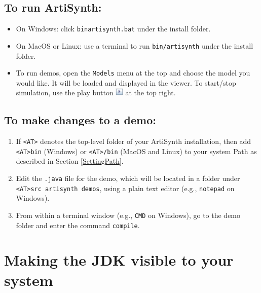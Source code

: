 \documentclass{article}
\begin{document}
\subsection{To run ArtiSynth:}

\begin{itemize}[leftmargin=26pt]
 
\item On Windows: click {\tt bin\BKS artisynth.bat} under the install folder. 
 
\item On MacOS or Linux: use a terminal to run {\tt bin/artisynth} 
under the install folder.

\item[\ ] To run demos, open the {\tt Models} menu at the top and
choose the model you would like. It will be loaded and displayed in
the viewer. To start/stop simulation, use the play button
\includegraphics[width=0.15in]{images/playButton} at the top right.

\end{itemize}

\subsection{To make changes to a demo:}

\begin{enumerate}

\item If {\tt <AT>} denotes the top-level folder of your ArtiSynth
installation, then add {\tt <AT>\BKS bin} (Windows) or {\tt <AT>/bin}
(MacOS and Linux) to your system Path
as described in Section \ref{SettingPath}.

\item Edit the {\tt .java} file for the demo, which will be located
in a folder under {\tt <AT>\BKS src \BKS artisynth \BKS demos},
using a plain text editor (e.g., {\tt notepad} on Windows).

\item From within a terminal window (e.g., {\tt CMD} on Windows), go to the
demo folder and enter the command {\tt compile}.

\end{enumerate}

\section{Making the JDK visible to your system}
\label{MakingJDKVisible}
\end{document}
